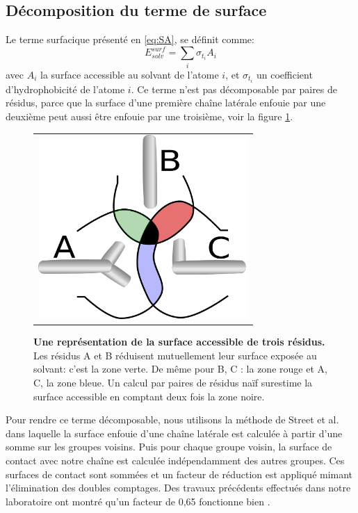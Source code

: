 \subsection{Décomposition du terme de surface}
\label{sub:surpairwise}

Le terme surfacique présenté en \vref{eq:SA}, se définit comme:
\begin{equation}
E_{solv}^{surf} = \sum_i \sigma_{t_i} A_i 
\end{equation}
avec $A_i$ la surface accessible au solvant de l'atome $i$, et $\sigma_{t_i}$ un coefficient d'hydrophobicité de l'atome $i$.
Ce terme n'est pas décomposable par paires de résidus, parce que la surface d'une première chaîne latérale enfouie par une deuxième peut aussi être enfouie par une troisième, voir la figure \ref{fig:intersurf}.

   \begin{figure}[!htbp]
     \centering
     \begin{tabular}{c}
       \includegraphics[width=8cm]{figure/intersurface.pdf} 
     \end{tabular}
     
     \caption{\textbf{Une représentation de la surface accessible de trois résidus.} Les résidus A et B réduisent mutuellement leur surface exposée au solvant: c'est la zone verte. De même pour B, C : la zone rouge et  A, C, la zone bleue. Un calcul par paires de résidus naïf surestime la surface accessible en comptant deux fois la zone noire. }
\label{fig:intersurf}
   \end{figure}


Pour rendre ce terme décomposable, nous utilisons la méthode de Street et al. \cite{Street98} dans laquelle la surface enfouie d'une chaîne latérale est calculée à partir d'une somme sur les groupes voisins. Puis pour chaque groupe voisin, la surface de contact avec notre chaîne est calculée indépendamment des autres groupes. Ces surfaces de contact sont sommées et un facteur de réduction est appliqué mimant l'élimination des doubles comptages. Des travaux précédents effectués dans notre laboratoire ont montré qu'un facteur de 0,65 fonctionne bien \cite{Lopes07,Gaillard14}.   


